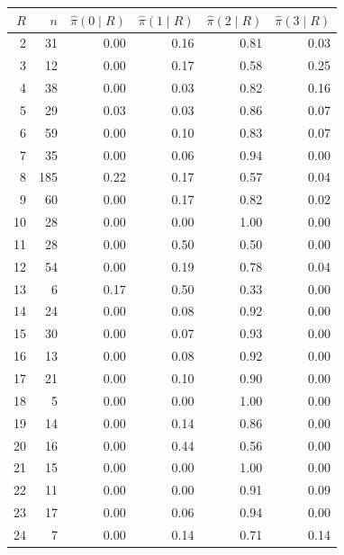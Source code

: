 \begin{tabular}{rrrrrr}
\toprule
$R$ & $n$ & $\hat\pi(0\mid R)$ & $\hat\pi(1\mid R)$ & $\hat\pi(2\mid R)$ & $\hat\pi(3\mid R)$ \\
\midrule
2 & 31 & 0.00 & 0.16 & 0.81 & 0.03 \\
3 & 12 & 0.00 & 0.17 & 0.58 & 0.25 \\
4 & 38 & 0.00 & 0.03 & 0.82 & 0.16 \\
5 & 29 & 0.03 & 0.03 & 0.86 & 0.07 \\
6 & 59 & 0.00 & 0.10 & 0.83 & 0.07 \\
7 & 35 & 0.00 & 0.06 & 0.94 & 0.00 \\
8 & 185 & 0.22 & 0.17 & 0.57 & 0.04 \\
9 & 60 & 0.00 & 0.17 & 0.82 & 0.02 \\
10 & 28 & 0.00 & 0.00 & 1.00 & 0.00 \\
11 & 28 & 0.00 & 0.50 & 0.50 & 0.00 \\
12 & 54 & 0.00 & 0.19 & 0.78 & 0.04 \\
13 & 6 & 0.17 & 0.50 & 0.33 & 0.00 \\
14 & 24 & 0.00 & 0.08 & 0.92 & 0.00 \\
15 & 30 & 0.00 & 0.07 & 0.93 & 0.00 \\
16 & 13 & 0.00 & 0.08 & 0.92 & 0.00 \\
17 & 21 & 0.00 & 0.10 & 0.90 & 0.00 \\
18 & 5 & 0.00 & 0.00 & 1.00 & 0.00 \\
19 & 14 & 0.00 & 0.14 & 0.86 & 0.00 \\
20 & 16 & 0.00 & 0.44 & 0.56 & 0.00 \\
21 & 15 & 0.00 & 0.00 & 1.00 & 0.00 \\
22 & 11 & 0.00 & 0.00 & 0.91 & 0.09 \\
23 & 17 & 0.00 & 0.06 & 0.94 & 0.00 \\
24 & 7 & 0.00 & 0.14 & 0.71 & 0.14 \\
\bottomrule
\end{tabular}
